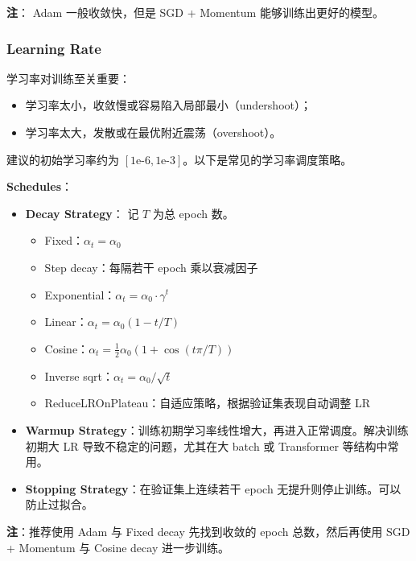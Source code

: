 \textbf{注}： Adam 一般收敛快，但是 SGD + Momentum
能够训练出更好的模型。

\subsubsection{Learning Rate}\label{learning-rate}

学习率对训练至关重要：

\begin{itemize}
\tightlist
\item
  学习率太小，收敛慢或容易陷入局部最小（undershoot）；
\item
  学习率太大，发散或在最优附近震荡（overshoot）。
\end{itemize}

建议的初始学习率约为
\([\text{1e-6}, \text{1e-3}]\)。以下是常见的学习率调度策略。

\textbf{Schedules}：

\begin{itemize}
\tightlist
\item
  \textbf{Decay Strategy}： 记 \(T\) 为总 epoch 数。

  \begin{itemize}
  \tightlist
  \item
    Fixed：\(\alpha_t = \alpha_0\)
  \item
    Step decay：每隔若干 epoch 乘以衰减因子
  \item
    Exponential：\(\alpha_t = \alpha_0 \cdot \gamma^t\)
  \item
    Linear：\(\alpha_t = \alpha_0 (1 - t/T)\)
  \item
    Cosine：\(\alpha_t = \frac{1}{2} \alpha_0 (1 + \cos(t\pi/T))\)
  \item
    Inverse sqrt：$ \alpha_t = \alpha_0 / \sqrt{t}$
  \item
    ReduceLROnPlateau：自适应策略，根据验证集表现自动调整 LR
  \end{itemize}
\item
  \textbf{Warmup
  Strategy}：训练初期学习率线性增大，再进入正常调度。解决训练初期大 LR
  导致不稳定的问题，尤其在大 batch 或 Transformer 等结构中常用。
\item
  \textbf{Stopping Strategy}：在验证集上连续若干 epoch
  无提升则停止训练。可以防止过拟合。
\end{itemize}

\textbf{注}：推荐使用 Adam 与 Fixed decay 先找到收敛的 epoch
总数，然后再使用 SGD + Momentum 与 Cosine decay 进一步训练。

